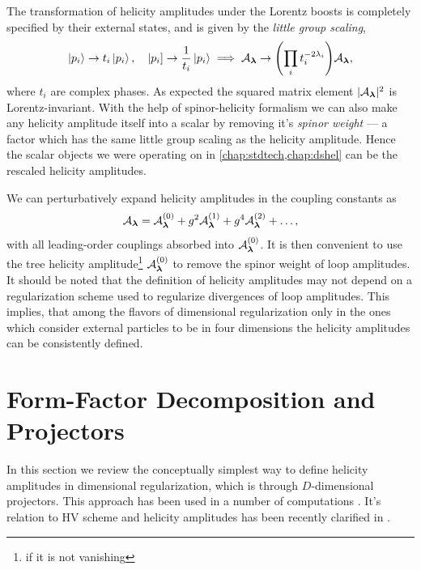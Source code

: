 The transformation of helicity amplitudes under the Lorentz boosts is completely specified by their 
external states, and is given by the \emph{little group scaling},
\begin{equation}
  \ket{p_i} \to t_i \ket{p_i}, \quad  \left\vert p_i \right] \to \frac{1}{t_i} \ket{p_i} \implies \mathcal{A}_{\vb*{\lambda}} \to  \qty(\prod_i t_i^{-2\lambda_i}) \mathcal{A}_{\vb*{\lambda}},
\end{equation}
where $t_i$ are complex phases.
As expected the squared matrix element $\vert \mathcal{A}_{\vb*{\lambda}}{} \vert^2$ is Lorentz-invariant.
With the help of spinor-helicity formalism we can also make any helicity amplitude itself into a scalar
by removing it's \emph{spinor weight} --- a factor which has the same little group scaling
as the helicity amplitude.
Hence the scalar objects we were operating on in \cref{chap:stdtech,chap:dshel} can be the rescaled helicity amplitudes.

We can perturbatively expand helicity amplitudes in the coupling constants as
\begin{equation}
  \mathcal{A}_{\vb*{\lambda}} =  \mathcal{A}_{\vb*{\lambda}}^{(0)} + g^2 \mathcal{A}_{\vb*{\lambda}}^{(1)} + g^4 \mathcal{A}_{\vb*{\lambda}}^{(2)} + \ldots{},
\end{equation}
with all leading-order couplings absorbed into $\mathcal{A}_{\vb*{\lambda}}^{(0)}$.
It is then convenient to use the tree helicity amplitude\footnote{if it is not vanishing} $\mathcal{A}_{\vb*{\lambda}} ^{(0)}$ to remove the spinor weight
of loop amplitudes.
It should be noted that the definition of helicity amplitudes may not depend on a regularization scheme
used to regularize divergences of loop amplitudes. This implies, that 
among the flavors of dimensional regularization only in the ones which consider external particles 
to be in four dimensions the helicity amplitudes can be consistently defined.


\section{Form-Factor Decomposition and Projectors}
\label{sec:helampl_projectors}

In this section we review the conceptually simplest way to define helicity amplitudes in dimensional regularization, which is through $D$-dimensional projectors.
This approach has been used in a number of computations \cite{Garland:2002ak, Moch:2002hm, Glover:2003cm, Glover:2004si,Gehrmann:2009vu,Gehrmann:2011aa}.
It's relation to HV scheme and helicity amplitudes has been recently clarified in \cite{Peraro:2019cjj}.


